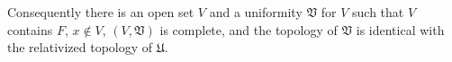 Consequently there is an open set $V$ and a uniformity $\mathfrak{V}$ for $V$ such that $V$ contains $F$, $x \notin V$, $(V, \mathfrak{V})$ is complete, and the topology of $\mathfrak{V}$ is identical with the relativized topology of $\mathfrak{U}$.

